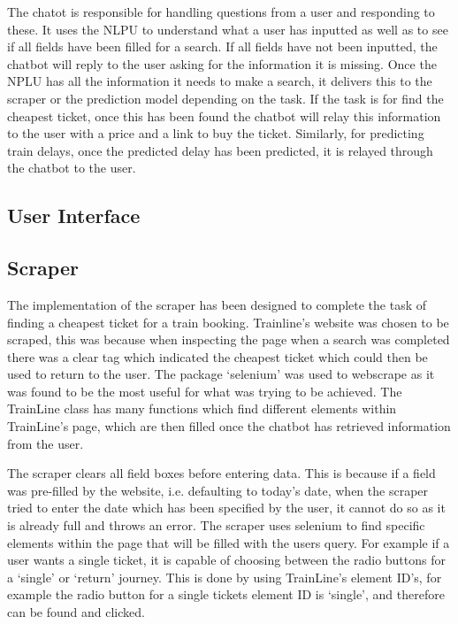 \documentclass[11pt]{article}
\begin{document}
	
	The chatot is responsible for handling questions from a user and responding to these. It uses the NLPU to understand what a user has inputted as well as to see if all fields have been filled for a search. If all fields have not been inputted, the chatbot will reply to the user asking for the information it is missing. Once the NPLU has all the information it needs to make a search, it delivers this to the scraper or the prediction model depending on the task. If the task is for find the cheapest ticket, once this has been found the chatbot will relay this information to the user with a price and a link to buy the ticket. Similarly, for predicting train delays, once the predicted delay has been predicted, it is relayed through the chatbot to the user.
	
	\subsection{User Interface} 
	
	\subsection{Scraper}
	The implementation of the scraper has been designed to complete the task of finding a cheapest ticket for a train booking. Trainline’s website \citet{trainline} was chosen to be scraped, this was because when inspecting the page when a search was completed there was a clear tag which indicated the cheapest ticket which could then be used to return to the user. The package `selenium’ \citet{selenium} was used to webscrape as it was found to be the most useful for what was trying to be achieved. The TrainLine class has many functions which find different elements within TrainLine’s page, which are then filled once the chatbot has retrieved information from the user. 
	
	The scraper clears all field boxes before entering data. This is because if a field was pre-filled by the website, i.e. defaulting to today's date, when the scraper tried to enter the date which has been specified by the user, it cannot do so as it is already full and throws an error. The scraper uses selenium to find specific elements within the page that will be filled with the users query. For example if a user wants a single ticket, it is capable of choosing between the radio buttons for a `single’ or `return’ journey. This is done by using TrainLine’s element ID’s, for example the radio button for a single tickets element ID is `single’, and therefore can be found and clicked. 
	
\end{document}
